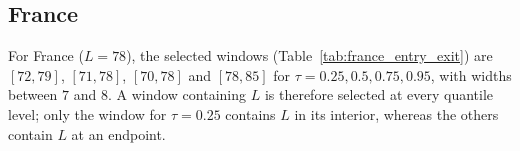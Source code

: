 \documentclass[12pt,a4paper]{article}
\begin{document}
\subsection{France}
\label{subsec:france}

{\color{blue}
For France ($L=78$), the selected windows
(Table~\ref{tab:france_entry_exit}) are $[72,79]$, $[71,78]$, $[70,78]$
and $[78,85]$ for $\tau=0.25,0.5,0.75,0.95$, with widths between $7$
and $8$. A window containing $L$ is therefore selected at every
quantile level; only the window for $\tau=0.25$ contains $L$ in its
interior, whereas the others contain $L$ at an endpoint.}

%
%
\end{document}
